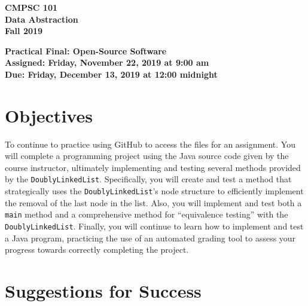\documentclass[11pt]{article}
\newcommand{\assignmentduedate}{December 13}
\newcommand{\assignmentassignedate}{November 22}
\newcommand{\assignmentnumber}{Final: Open-Source Software}
\newcommand{\labyear}{2019}
\newcommand{\labday}{Friday}
\newcommand{\labdueday}{Friday}
\newcommand{\labduetime}{12:00 midnight}
\newcommand{\labtime}{9:00 am}
\newcommand{\assigneddate}{Assigned: \labday, \assignmentassignedate, \labyear{} at \labtime{}}
\newcommand{\duedate}{Due: \labdueday, \assignmentduedate, \labyear{} at \labduetime{}}
\newcommand{\mainprogram}{\lstinline{DoublyLinkedList}}
\newcommand{\program}[1]{\lstinline{#1}}
\newcommand{\labtitle}[1]
{
  \begin{center}
    \begin{center}
      \bf
      CMPSC 101\\Data Abstraction\\
      Fall 2019\\
      \medskip
    \end{center}
    \bf
    #1
  \end{center}
}
\begin{document}
\thispagestyle{empty}

\labtitle{Practical \assignmentnumber{} \\ \assigneddate{} \\ \duedate{}}

\section*{Objectives}

To continue to practice using GitHub to access the files for an assignment. You
will complete a programming project using the Java source code given by the
course instructor, ultimately implementing and testing several methods provided
by the \mainprogram{}. Specifically, you will create and test a method that
strategically uses the \mainprogram's node structure to efficiently implement
the removal of the last node in the list. Also, you will implement and test both
a \program{main} method and a comprehensive method for ``equivalence testing''
with the \mainprogram{}. Finally, you will continue to learn how to implement
and test a Java program, practicing the use of an automated grading tool to
assess your progress towards correctly completing the project.

\section*{Suggestions for Success}
\end{document}
